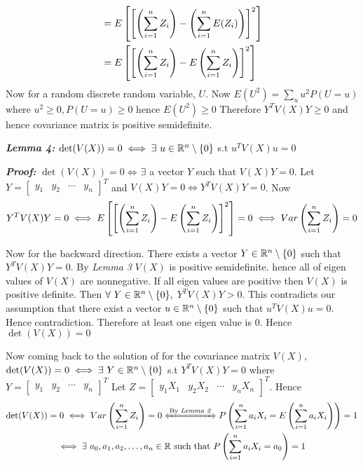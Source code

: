 \documentclass[a4paper, 11pt]{article}
\begin{document}
{\begin{align*}
                       & =E\left[\left[\left(\sum_{i=1}^nZ_i\right)-\left(\sum_{i=1}^nE(Z_i)\right)\right]^2\right]                                                                                                                                                                          \\
                       & =E\left[\left[\left(\sum_{i=1}^nZ_i\right)-E\left(\sum_{i=1}^nZ_i\right)\right]^2\right]
	\end{align*}Now for a random discrete random variable, $U$. Now $E(U^2)=\sum\limits_{u} u^2P(U=u)$ where $u^2\geq 0, P(U=u)\geq 0$ hence $E(U^2)\geq 0$ Therefore $Y^TV(X)Y\geq 0$ and hence covariance matrix is positive semidefinite.

	\textbf{\textit{Lemma 4: }}$\det(V(X))=0\iff\exs\ u\in\bbR^n\setminus\{0\}$ s.t $u^TV(X)u=0$

	\textbf{\textit{Proof: }}$\det(V(X))=0\iff $$\exists$ a vector $Y$ such that $V(X)Y=0$. Let $Y=\begin{bmatrix}
		y_1 & y_2 & \cdots & y_n
	\end{bmatrix}^T$ and $V(X)Y=0\iff Y^TV(X)Y=0$. Now $$Y^TV(X)Y=0\iff E\left[\left[\left(\sum_{i=1}^nZ_i\right)-E\left(\sum_{i=1}^nZ_i\right)\right]^2\right]  =0\iff Var\left(\sum_{i=1}^nZ_i\right)=0$$\parinn

	Now for the backward direction. There exists a vector $Y\in \mathbb{R}^n\setminus\{0\}$ such that $Y^TV(X)Y=0$. By \textit{Lemma 3} $V(X)$ is positive semidefinite. hence all of eigen values of $V(X)$ are nonnegative. If all eigen values are positive then $V(X)$ is positive definite. Then $\forall\ Y\in\bbR^n\setminus\{0\}, $ $Y^TV(X)Y>0$. This contradicts our assumption that there exist a vector $u\in\mathbb{R}^n\setminus\{0\}$ such that $u^TV(X)u=0$. Hence contradiction. Therefore at least one eigen value is 0. Hence $\det(V(X))=0$

	\parinn
	\vspace{5mm}

	Now coming back to the solution of for the covariance matrix $V(X)$,  $\det(V(X))=0\iff\exs\ Y\in\bbR^n\setminus\{0\}$ s.t $Y^TV(X)Y=0$ where $Y=\begin{bmatrix}
			y_1 & y_2 & \cdots & y_n		\end{bmatrix}^T$  Let $Z=\begin{bmatrix}
			y_1X_1 & y_2X_2 & \cdots & y_nX_n
		\end{bmatrix}^T$.                     Hence \begin{multline*}
		\det(V(X))=0\iff Var\lt(\sum\limits_{i=1}^nZ_i\rt)=0\xLeftrightarrow{\text{By \textit{Lemma 2}}} P\lt(\sum\limits_{i=1}^n a_iX_i = E\lt(\sum\limits_{i=1}^n a_iX_i\rt)\rt)=1\\\iff\exs\ a_0,a_1,a_2,\dots,a_n\in\bbR\text{ such that }P\lt(\sum_{i=1}^na_iX_i=a_0\rt)=1
	\end{multline*}
}
\end{document}
